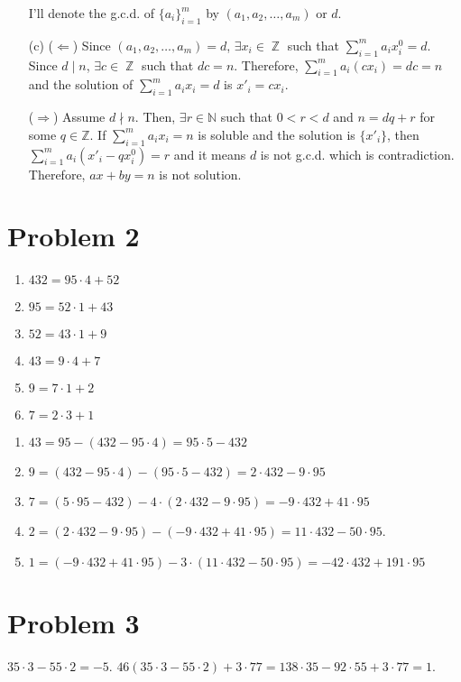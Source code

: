 \documentclass{article}
\DeclareMathOperator{\zz}{\mathbb{Z}}
\begin{document}
\begin{enumerate}
    I'll denote the g.c.d. of $\{a_i\}_{i=1}^m$ by $(a_1, a_2, \ldots, a_m)$ or $d$.
    
    \item[(c)] ($\Leftarrow$) Since $(a_1, a_2, \ldots, a_m)=d$, $\exists x_i\in \zz$ such that $\sum\limits_{i=1}^m a_i x^0_i=d$. Since $d\mid n$, $\exists c\in \zz$ such that $dc=n$. Therefore, $\sum\limits_{i=1}^m a_i (cx_i)=dc=n$ and the solution of $\sum\limits_{i=1}^m a_i x_i=d$ is $x'_i=cx_i$.
    
    ($\Rightarrow$) Assume $d\nmid n$. Then, $\exists r\in \mathbb{N}$ such that $0<r<d$ and $n=dq+r$ for some $q\in \mathbb{Z}$. If $\sum\limits_{i=1}^m a_i x_i=n$ is soluble and the solution is $\{x'_i\}$, then $\sum\limits_{i=1}^m a_i(x'_i-qx^0_i)=r$ and it means $d$ is not g.c.d. which is contradiction. Therefore, $ax+by=n$ is not solution.
\end{enumerate}
\section*{Problem 2}
\begin{enumerate}
\item $432=95\cdot 4+52$
\item $95=52\cdot 1+43$
\item $52=43\cdot 1+9$
\item $43=9\cdot 4+7$
\item $9=7 \cdot 1+2$
\item $7=2\cdot 3 +1$
\end{enumerate}

\begin{enumerate}
\item $43=95-(432-95\cdot 4)=95\cdot 5-432$
\item $9=(432-95\cdot 4)-(95\cdot 5-432)=2\cdot 432 - 9\cdot 95$
\item $7=(5\cdot 95-432)-4\cdot (2\cdot 432 - 9\cdot 95)=-9\cdot 432 + 41\cdot 95$
\item $2=(2\cdot 432 - 9\cdot 95)-(-9\cdot 432 + 41\cdot 95)=11\cdot 432 - 50\cdot 95$.
\item $1=(-9\cdot 432 + 41\cdot 95)-3\cdot(11\cdot 432 - 50\cdot 95)=-42\cdot 432 + 191 \cdot 95$
\end{enumerate}

\section*{Problem 3}
$35\cdot 3- 55\cdot 2=-5$. $46(35\cdot 3- 55\cdot 2)+3\cdot 77=138\cdot 35-92 \cdot 55+3\cdot 77=1$.
\end{document}
